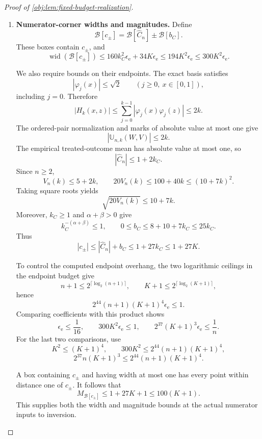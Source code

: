 \documentclass[11pt]{article}
\begin{document}
\begin{proof}[Proof of \cref{obj:lem:fixed-budget-realization}]
\begin{enumerate}
\item \textbf{Numerator-corner widths and magnitudes.}
Define
\[
\mathcal B[c_\pm]
=\mathcal B[\widehat C_n]\pm\mathcal B[b_C].
\]
These boxes contain \(c_\pm\), and
\[
\operatorname{wid}(\mathcal B[c_\pm])
\le160k_C^2\epsilon_{\mathrm e}+34K\epsilon_{\mathrm e}
\le194K^2\epsilon_{\mathrm e}
\le300K^2\epsilon_{\mathrm e}.
\]

We also require bounds on their endpoints. The exact basis satisfies
\[
|\varphi_j(x)|\le\sqrt2
\qquad(j\ge0,\ x\in[0,1]),
\]
including \(j=0\). Therefore
\[
|H_k(x,z)|
\le\sum_{j=0}^{k-1}|\varphi_j(x)\varphi_j(z)|
\le2k.
\]
The ordered-pair normalization and marks of absolute value at most one give
\[
|\mathbb U_{n,k}(W,V)|\le2k.
\]
The empirical treated-outcome mean has absolute value at most one, so
\[
|\widehat C_n|\le1+2k_C.
\]
Since \(n\ge2\),
\[
V_n(k)\le5+2k,
\qquad
20V_n(k)\le100+40k\le(10+7k)^2.
\]
Taking square roots yields
\[
\sqrt{20V_n(k)}\le10+7k.
\]
Moreover, \(k_C\ge1\) and \(\alpha+\beta>0\) give
\[
k_C^{-(\alpha+\beta)}\le1,
\qquad
0\le b_C\le8+10+7k_C\le25k_C.
\]
Thus
\[
|c_\pm|
\le|\widehat C_n|+b_C
\le1+27k_C\le1+27K.
\]

To control the computed endpoint overhang, the two logarithmic ceilings in the endpoint budget give
\[
n+1\le2^{\lceil\log_2(n+1)\rceil},
\qquad
K+1\le2^{\lceil\log_2(K+1)\rceil},
\]
hence
\[
2^{44}(n+1)(K+1)^4\epsilon_{\mathrm e}\le1.
\]
Comparing coefficients with this product shows
\[
\epsilon_{\mathrm e}\le\frac1{16},
\qquad
300K^2\epsilon_{\mathrm e}\le1,
\qquad
2^{37}(K+1)^3\epsilon_{\mathrm e}\le\frac1n.
\]
For the last two comparisons, use
\[
K^2\le(K+1)^4,
\qquad
300K^2\le2^{44}(n+1)(K+1)^4,
\]
\[
2^{37}n(K+1)^3
\le2^{44}(n+1)(K+1)^4.
\]

A box containing \(c_\pm\) and having width at most one has every point within distance one of \(c_\pm\). It follows that
\[
M_{\mathcal B[c_\pm]}
\le1+27K+1\le100(K+1).
\]
This supplies both the width and magnitude bounds at the actual numerator inputs to inversion.


\end{enumerate}
\end{proof}
\end{document}
